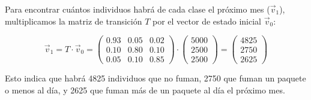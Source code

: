 \documentclass{article}
\begin{document}
Para encontrar cuántos individuos habrá de cada clase el próximo mes (\(\vec{v}_1\)), multiplicamos la matriz de transición \(T\) por el vector de estado inicial \(\vec{v}_0\):

\[
    \vec{v}_1 = T \cdot \vec{v}_0 = \begin{pmatrix}
        0.93 & 0.05 & 0.02 \\
        0.10 & 0.80 & 0.10 \\
        0.05 & 0.10 & 0.85
    \end{pmatrix}
    \cdot
    \begin{pmatrix}
        5000 \\
        2500 \\
        2500
    \end{pmatrix}
    =
    \begin{pmatrix}
        4825 \\
        2750 \\
        2625
    \end{pmatrix}
\]

Esto indica que habrá 4825 individuos que no fuman, 2750 que fuman un paquete o menos al día, y 2625 que fuman más de un paquete al día el próximo mes.
\end{document}
